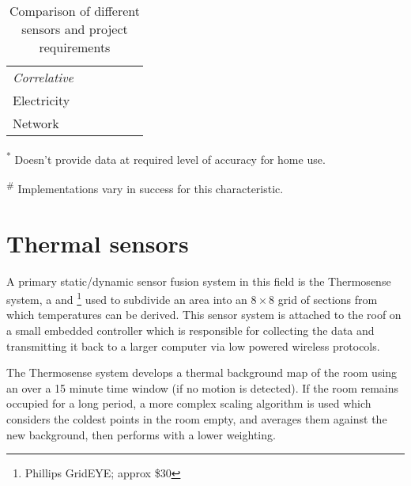 \documentclass[../thesis/thesis.tex]{subfiles}
\begin{document}
\begin{table}
\begin{threeparttable}
\begin{tabularx}{\textwidth}{|l|l|l||l||l|l|}
\hspace{3mm}\textit{Correlative} 	& & & & & \\
\hspace{8mm}Electricity 		& \cmark & \xmark & \cmark & & \\
\hspace{8mm}Network			& \cmark & \xmark & \cmark & & \\

\cline{1-6}
\end{tabularx}
\begin{tablenotes}
\item \textsuperscript{*} Doesn't provide data at required level of accuracy for home use.
\item \textsuperscript{\#} Implementations vary in success for this characteristic.
\end{tablenotes}
\end{threeparttable}
\caption{Comparison of different sensors and project requirements}
\label{tab:litreview:taxonomycomp}
\end{table}

\section{Thermal sensors}
\label{sec:litreview:thermalsensors}

A primary static/dynamic sensor fusion system in this field is the Thermosense system, \cite{beltran2013thermosense} a \pir and \iar\footnote{Phillips GridEYE; approx \$30} used to subdivide an area into an $8\times8$ grid of sections from which temperatures can be derived. This sensor system is attached to the roof on a small embedded controller which is responsible for collecting the data and transmitting it back to a larger computer via low powered wireless protocols.

The Thermosense system develops a thermal background map of the room using an \emwa over a 15 minute time window (if no motion is detected). If the room remains occupied for a long period, a more complex scaling algorithm is used which considers the coldest points in the room empty, and averages them against the new background, then performs \emwa with a lower weighting.
\end{document}
